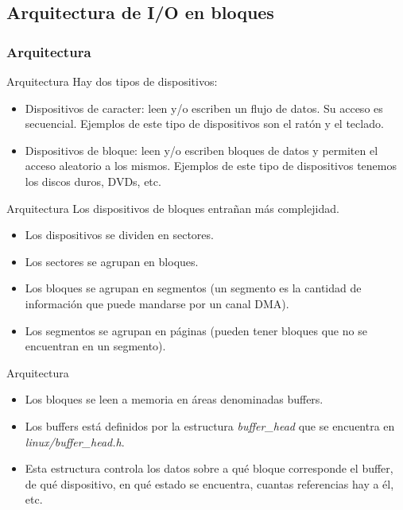 \subsection{Arquitectura de I/O en bloques}
\subsubsection{Arquitectura}
\begin{frame}{Arquitectura}
	Hay dos tipos de dispositivos:
	\begin{itemize}
		\item Dispositivos de caracter: leen y/o escriben un flujo de datos. Su acceso es secuencial. Ejemplos de este tipo de dispositivos son el ratón y el teclado.
		\item Dispositivos de bloque: leen y/o escriben bloques de datos y permiten el acceso aleatorio a los mismos. Ejemplos de este tipo de dispositivos tenemos los discos duros, DVDs, etc.
	\end{itemize}
\end{frame}

\begin{frame}{Arquitectura}
	Los dispositivos de bloques entrañan más complejidad.
	\begin{itemize}
		\item Los dispositivos se dividen en sectores.
		\item Los sectores se agrupan en bloques.
		\item Los bloques se agrupan en segmentos (un segmento es la cantidad de información que puede mandarse por un canal DMA).
		\item Los segmentos se agrupan en páginas (pueden tener bloques que no se encuentran en un segmento).
	\end{itemize}
\end{frame}

\begin{frame}{Arquitectura}
	\begin{itemize}
		\item Los bloques se leen a memoria en áreas denominadas buffers.
		\item Los buffers está definidos por la estructura \emph{buffer\_head} que se encuentra en \emph{linux/buffer\_head.h}.
		\item Esta estructura controla los datos sobre a qué bloque corresponde el buffer, de qué dispositivo, en qué estado se encuentra, cuantas referencias hay a él, etc.
	\end{itemize}
\end{frame}

